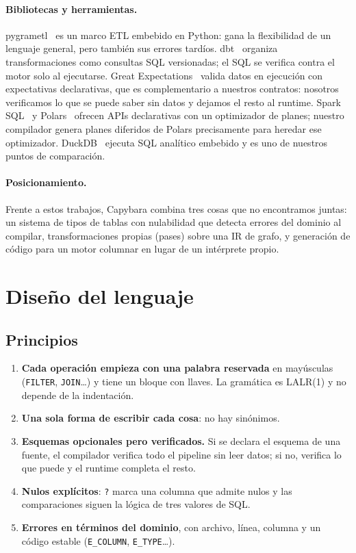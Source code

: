 \documentclass[sigplan,screen,nonacm]{acmart}
\begin{document}
\paragraph{Bibliotecas y herramientas.}
pygrametl~\cite{thomsen2009} es un marco ETL embebido en Python: gana la flexibilidad de un
lenguaje general, pero también sus errores tardíos. dbt~\cite{dbt} organiza transformaciones
como consultas SQL versionadas; el SQL se verifica contra el motor solo al ejecutarse. Great
Expectations~\cite{greatexpectations} valida datos en ejecución con expectativas
declarativas, que es complementario a nuestros contratos: nosotros verificamos lo que se
puede saber sin datos y dejamos el resto al runtime. Spark SQL~\cite{armbrust2015} y
Polars~\cite{polars} ofrecen APIs declarativas con un optimizador de planes; nuestro
compilador genera planes diferidos de Polars precisamente para heredar ese optimizador.
DuckDB~\cite{raasveldt2019} ejecuta SQL analítico embebido y es uno de nuestros puntos de
comparación.

\paragraph{Posicionamiento.}
Frente a estos trabajos, Capybara combina tres cosas que no encontramos juntas: un
sistema de tipos de tablas con nulabilidad que detecta errores del dominio al compilar,
transformaciones propias (pases) sobre una IR de grafo, y generación de código para un motor
columnar en lugar de un intérprete propio.

\section{Diseño del lenguaje}
\label{sec:diseno}

\subsection{Principios}
\begin{enumerate}
  \item \textbf{Cada operación empieza con una palabra reservada} en mayúsculas
    (\texttt{FILTER}, \texttt{JOIN}\ldots) y tiene un bloque con llaves. La gramática es
    LALR(1) y no depende de la indentación.
  \item \textbf{Una sola forma de escribir cada cosa}: no hay sinónimos.
  \item \textbf{Esquemas opcionales pero verificados.} Si se declara el esquema de una
    fuente, el compilador verifica todo el pipeline sin leer datos; si no, verifica lo que
    puede y el runtime completa el resto.
  \item \textbf{Nulos explícitos}: \texttt{?} marca una columna que admite nulos y las
    comparaciones siguen la lógica de tres valores de SQL.
  \item \textbf{Errores en términos del dominio}, con archivo, línea, columna y un código
    estable (\texttt{E\_COLUMN}, \texttt{E\_TYPE}\ldots).
\end{enumerate}
\end{document}
